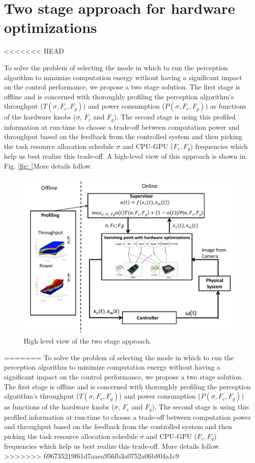\section{Two stage approach for hardware optimizations}
<<<<<<< HEAD

To solve the problem of selecting the mode in which to run the perception algorithm to minimize computation energy without having a significant impact on the control performance, we propose a two stage solution. The first stage is offline and is concerned with thoroughly profiling the perception algorithm's throughput ($T(\sigma,F_c,F_g)$) and power consumption ($P(\sigma,F_c,F_g)$) as functions of the hardware knobs ($\sigma$, $F_c$ and $F_g$). The second stage is using this profiled information at run-time to choose a trade-off between computation power and throughput based on the feedback from the controlled system and then picking the task resource allocation schedule $\sigma$ and CPU-GPU ($F_c,F_g$) frequencies which help us best realize this trade-off. A high-level view of this approach is shown in Fig. \ref{fig: }More details follow.


\begin{figure}[htbp]
	\centering
	\includegraphics[scale=0.36]{Figs/bigFig.pdf}
	\caption{High level view of the two stage approach.}
	\label{fig:juicyj}%
\end{figure}

=======
\label{sec:twoStage}
To solve the problem of selecting the mode in which to run the perception algorithm to minimize computation energy without having a significant impact on the control performance, we propose a two stage solution. The first stage is offline and is concerned with thoroughly profiling the perception algorithm's throughput ($T(\sigma,F_c,F_g)$) and power consumption ($P(\sigma,F_c,F_g)$) as functions of the hardware knobs ($\sigma$, $F_c$ and $F_g$). The second stage is using this profiled information at run-time to choose a trade-off between computation power and throughput based on the feedback from the controlled system and then picking the task resource allocation schedule $\sigma$ and CPU-GPU ($F_c,F_g$) frequencies which help us best realize this trade-off. More details follow.
>>>>>>> 696735219f61d7aaea956fb3a0752a06b804a1c9

